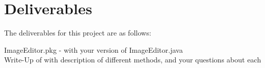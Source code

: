 \section{Deliverables}

The deliverables for this project are as follows:

	ImageEditor.pkg - with your version of ImageEditor.java\\
	Write-Up of with description of different methods, and your questions about each
